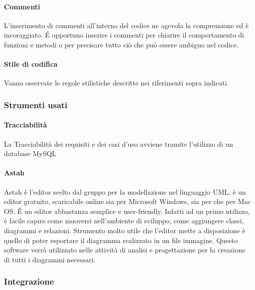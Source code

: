 \paragraph{Commenti}

L'inserimento di commenti all'interno del codice ne agevola la
comprensione ed è incoraggiato. \'E opportuno inserire i commenti per chiarire il
comportamento di funzioni e metodi o per precisare tutto ciò che può essere ambiguo
nel codice.

\paragraph{Stile di codifica}
Vanno osservate le regole stilistiche descritte nei riferimenti sopra indicati.

\subsubsection{Strumenti usati}

\paragraph{Tracciabilità}

La Tracciabilità dei requisiti e dei casi d'uso avviene tramite l'utilizzo di un database MySQL

\paragraph{Astah}

Astah è l'editor scelto dal gruppo per la modellazione nel linguaggio UML.  è un editor
gratuito, scaricabile online sia per Microsoft Windows, sia per  che per Mac OS. \'E
un editor abbastanza semplice e user-friendly. Infatti ad un primo utilizzo, è facile capire come
muoversi nell'ambiente di sviluppo, come aggiungere classi, diagrammi e relazioni. Strumento
molto utile che l'editor mette a disposizione è quello di poter esportare il diagramma realizzato in
un file immagine. Questo software verrà utilizzato nelle attività di analisi e progettazione per la creazione
di tutti i diagrammi  necessari.



\subsubsection{Integrazione}

